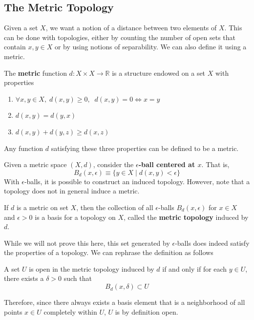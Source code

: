 \documentclass{article}
\begin{document}
  \subsection{The Metric Topology}

    Given a set $X$, we want a notion of a distance between two elements of $X$. This can be done with topologies, either by counting the number of open sets that contain $x, y \in X$ or by using notions of separability. We can also define it using a metric. 

    \begin{definition}
    The \textbf{metric} function $d: X \times X \longrightarrow \mathbb{R}$ is a structure endowed on a set $X$ with properties 
    \begin{enumerate}
        \item $\forall x, y \in X, \; d(x, y) \geq 0, \; \; d(x, y) = 0 \iff x = y$
        \item $d(x, y) = d(y, x)$ 
        \item $d(x, y) + d(y, z) \geq d(x, z)$
    \end{enumerate}
    Any function $d$ satisfying these three properties can be defined to be a metric. 
    \end{definition}

    Given a metric space $(X, d)$, consider the \textbf{$\epsilon$-ball centered at $x$}. That is, 
    \[B_d (x, \epsilon) \equiv \{y \in X \; | \; d(x, y) < \epsilon\}\]
    With $\epsilon$-balls, it is possible to construct an induced topology. However, note that a topology does not in general induce a metric. 

    \begin{definition}
    If $d$ is a metric on set $X$, then the collection of all $\epsilon$-balls $B_d (x, \epsilon)$ for $x \in X$ and $\epsilon > 0$ is a basis for a topology on $X$, called the \textbf{metric topology} induced by $d$. 
    \end{definition}

    While we will not prove this here, this set generated by $\epsilon$-balls does indeed satisfy the properties of a topology. We can rephrase the definition as follows 

    \begin{definition}
    A set $U$ is open in the metric topology induced by $d$ if and only if for each $y \in U$, there exists a $\delta > 0$ such that 
    \[B_d (x, \delta) \subset U\]
    \end{definition}
    Therefore, since there always exists a basis element that is a neighborhood of all points $x \in U$ completely within $U$, $U$ is by definition open. 
\end{document}
